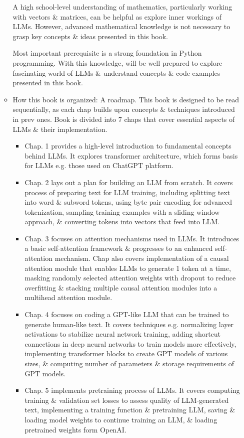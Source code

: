 \documentclass{article}
\begin{document}
\begin{itemize}
\begin{itemize}
		A high school-level understanding of mathematics, particularly working with vectors \& matrices, can be helpful as explore inner workings of LLMs. However, advanced mathematical knowledge is not necessary to grasp key concepts \& ideas presented in this book.
		
		Most important prerequisite is a strong foundation in Python programming. With this knowledge, will be well prepared to explore fascinating world of LLMs \& understand concepts \& code examples presented in this book.
		\item {\sf How this book is organized: A roadmap.} This book is designed to be read sequentially, as each chap builds upon concepts \& techniques introduced in prev ones. Book is divided into 7 chaps that cover essential aspects of LLMs \& their implementation.
		\begin{itemize}
			\item Chap. 1 provides a high-level introduction to fundamental concepts behind LLMs. It explores transformer architecture, which forms basis for LLMs e.g. those used on ChatGPT platform.
			\item Chap. 2 lays out a plan for building an LLM from scratch. It covers process of preparing text for LLM training, including splitting text into word \& subword tokens, using byte pair encoding for advanced tokenization, sampling training examples with a sliding window approach, \& converting tokens into vectors that feed into LLM.
			\item Chap. 3 focuses on attention mechanisms used in LLMs. It introduces a basic self-attention framework \& progresses to an enhanced self-attention mechanism. Chap also covers implementation of a causal attention module that enables LLMs to generate 1 token at a time, masking randomly selected attention weights with dropout to reduce overfitting \& stacking multiple causal attention modules into a multihead attention module.
			\item Chap. 4 focuses on coding a GPT-like LLM that can be trained to generate human-like text. It covers techniques e.g. normalizing layer activations to stabilize neural network training, adding shortcut connections in deep neural networks to train models more effectively, implementing transformer blocks to create GPT models of various sizes, \& computing number of parameters \& storage requirements of GPT models.
			\item Chap. 5 implements pretraining process of LLMs. It covers computing training \& validation set losses to assess quality of LLM-generated text, implementing a training function \& pretraining LLM, saving \& loading model weights to continue training an LLM, \& loading pretrained weights form OpenAI.

\end{itemize}
\end{itemize}
\end{itemize}
\end{document}
